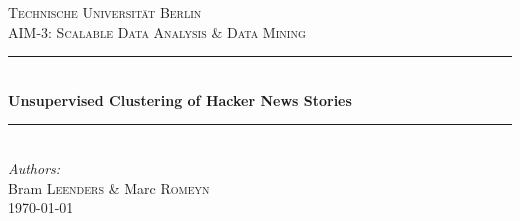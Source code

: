 %
%

\begin{titlepage}

\newcommand{\HRule}{\rule{\linewidth}{0.5mm}} %

\center %
 
\textsc{\LARGE Technische Universit\"at Berlin}\\[1.5cm] %
\textsc{\Large AIM-3: Scalable Data Analysis \& Data Mining}\\[0.5cm] %

\HRule \\[0.4cm]
{ \huge \bfseries Unsupervised Clustering of Hacker News Stories}\\[0.4cm]


\HRule \\[1.5cm]
\Large \emph{Authors:}\\
Bram \textsc{Leenders} \& Marc \textsc{Romeyn}\\[3cm]


{\large \today}\\[3cm] 


\vfill %

\end{titlepage}
